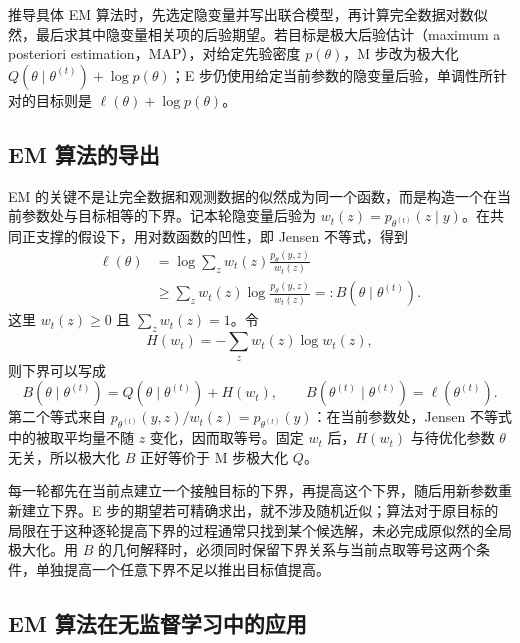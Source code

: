 \begin{notealert}[type=tip,title={从完全数据构造算法}]
推导具体 EM 算法时，先选定隐变量并写出联合模型，再计算完全数据对数似然，最后求其中隐变量相关项的后验期望。若目标是极大后验估计（maximum a posteriori estimation，MAP），对给定先验密度 $p(\theta)$，M 步改为极大化 $Q(\theta\mid\theta^{(t)})+\log p(\theta)$；E 步仍使用给定当前参数的隐变量后验，单调性所针对的目标则是 $\ell(\theta)+\log p(\theta)$。
\end{notealert}

\subsection{EM 算法的导出}
\label{subsec:lihang-em-derivation}

EM 的关键不是让完全数据和观测数据的似然成为同一个函数，而是构造一个在当前参数处与目标相等的下界。记本轮隐变量后验为 $w_t(z)=p_{\theta^{(t)}}(z\mid y)$。在共同正支撑的假设下，用对数函数的凹性，即 Jensen 不等式，得到
\begin{equation}
  \begin{aligned}
    \ell(\theta)
    &=\log\sum_z w_t(z)\frac{p_\theta(y,z)}{w_t(z)}\\
    &\geq\sum_z w_t(z)\log\frac{p_\theta(y,z)}{w_t(z)}
    =:B(\theta\mid\theta^{(t)}).
  \end{aligned}
  \label{eq:lihang-em-jensen-bound}
\end{equation}
这里 $w_t(z)\geq0$ 且 $\sum_z w_t(z)=1$。令
\[
  H(w_t)=-\sum_z w_t(z)\log w_t(z),
\]
则下界可以写成
\begin{equation}
  B(\theta\mid\theta^{(t)})=Q(\theta\mid\theta^{(t)})+H(w_t),\qquad
  B(\theta^{(t)}\mid\theta^{(t)})=\ell(\theta^{(t)}).
  \label{eq:lihang-em-touching-bound}
\end{equation}
第二个等式来自 $p_{\theta^{(t)}}(y,z)/w_t(z)=p_{\theta^{(t)}}(y)$：在当前参数处，Jensen 不等式中的被取平均量不随 $z$ 变化，因而取等号。固定 $w_t$ 后，$H(w_t)$ 与待优化参数 $\theta$ 无关，所以极大化 $B$ 正好等价于 M 步极大化 $Q$。

每一轮都先在当前点建立一个接触目标的下界，再提高这个下界，随后用新参数重新建立下界。E 步的期望若可精确求出，就不涉及随机近似；算法对于原目标的局限在于这种逐轮提高下界的过程通常只找到某个候选解，未必完成原似然的全局极大化。用 $B$ 的几何解释时，必须同时保留下界关系与当前点取等号这两个条件，单独提高一个任意下界不足以推出目标值提高。

\subsection{EM 算法在无监督学习中的应用}
\label{subsec:lihang-em-unsupervised}

